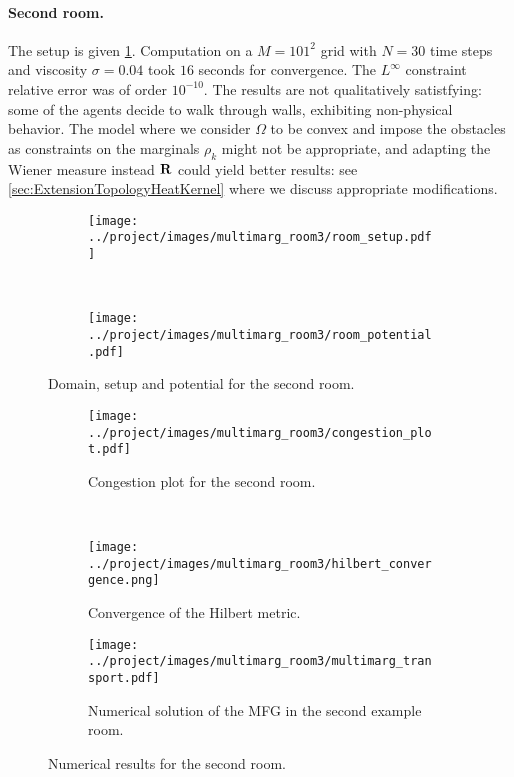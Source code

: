 \documentclass[../report.tex]{subfiles}
\begin{document}
\paragraph{Second room.} The setup is given \cref{fig:Room3}. Computation on a $M=101^2$ grid with $N=30$ time steps and viscosity $\sigma = 0.04$ took $16$ seconds for convergence. The $L^\infty$ constraint relative error was of order $10^{-10}$.
The results are not qualitatively satistfying: some of the agents decide to walk through walls, exhibiting non-physical behavior. The model where we consider $\Omega$ to be convex and impose the obstacles as constraints on the marginals $\rho_k$ might not be appropriate, and adapting the Wiener measure instead $\mathbf{R}$ could yield better results: see \cref{sec:ExtensionTopologyHeatKernel} where we discuss appropriate modifications.
\begin{figure}[!h]
	\centering
	\begin{subfigure}[c]{.4\linewidth}
		\texttt{[image: ../project/images/multimarg\_room3/room\_setup.pdf]}	
	\end{subfigure}~
	\begin{subfigure}[c]{.45\linewidth}
		\texttt{[image: ../project/images/multimarg\_room3/room\_potential.pdf]}	
	\end{subfigure}
	\caption{Domain, setup and potential for the second room.}\label{fig:Room3}
\end{figure}

\begin{figure}[!h]
	\centering
	\begin{subfigure}[c]{.4\linewidth}
		\texttt{[image: ../project/images/multimarg\_room3/congestion\_plot.pdf]}\caption{Congestion plot for the second room.}
	\end{subfigure}~
	\begin{subfigure}[c]{.4\linewidth}
		\texttt{[image: ../project/images/multimarg\_room3/hilbert\_convergence.png]}
		\caption{Convergence of the Hilbert metric.}
	\end{subfigure}
	\begin{subfigure}[c]{.8\linewidth}
		\texttt{[image: ../project/images/multimarg\_room3/multimarg\_transport.pdf]}
		\caption{Numerical solution of the MFG in the second example room.}\label{fig:NMargEx3}
	\end{subfigure}
	\caption{Numerical results for the second room.}\label{fig:Room3Results}
\end{figure}
\end{document}

